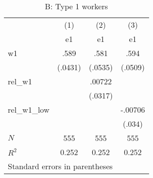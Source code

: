 \begin{table}[htbp]\centering
\caption{B: Type 1 workers}
\begin{tabular}{l*{3}{c}}
\hline\hline
            &\multicolumn{1}{c}{(1)}&\multicolumn{1}{c}{(2)}&\multicolumn{1}{c}{(3)}\\
            &\multicolumn{1}{c}{e1}&\multicolumn{1}{c}{e1}&\multicolumn{1}{c}{e1}\\
\hline
w1          &        .589&        .581&        .594\\
            &     (.0431)&     (.0535)&     (.0509)\\
[1em]
rel\_w1      &            &      .00722&            \\
            &            &     (.0317)&            \\
[1em]
rel\_w1\_low  &            &            &     -.00706\\
            &            &            &      (.034)\\
\hline
\(N\)       &         555&         555&         555\\
\(R^{2}\)   &       0.252&       0.252&       0.252\\
\hline\hline
\multicolumn{4}{l}{\footnotesize Standard errors in parentheses}\\
\end{tabular}
\end{table}
